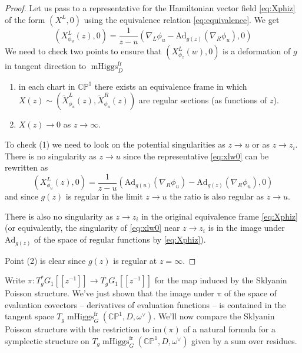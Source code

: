 \documentclass[11pt, oneside, reqno]{amsart}
\theoremstyle{definition} \newtheorem{definition}{Definition}[section]
\theoremstyle{definition} \newtheorem{remark}[definition]{Remark}
\theoremstyle{definition} \newtheorem{remarks}[definition]{Remarks}
\theoremstyle{definition} \newtheorem{question}[definition]{Question}
\theoremstyle{definition} \newtheorem*{note}{Note}
\theoremstyle{definition} \newtheorem{example}[definition]{Example}
\theoremstyle{definition} \newtheorem{examples}[definition]{Examples}
\newcommand{\bb}[1]{\mathbb{#1}}
\newcommand{\mr}[1]{\mathrm{#1}}
\DeclareMathOperator{\mhiggs}{mHiggs}
\newcommand{\fr}{\mathrm{fr}}
\newcommand{\Ad}{\mr{Ad}}
\begin{document}
\begin{proof}
  Let us pass to a representative for the Hamiltonian vector field \ref{eq:Xphiz} of the form $(X^{L}, 0)$ using the equivalence relation \ref{eq:equivalence}. We get
  \begin{equation}
\label{eq:xlw0}
(X^L_{\phi_u} (z) , 0) =  \frac{1}{z - u} (\nabla_{L} \phi_u  - \Ad_{g(z)} (\nabla_{R} \phi_{u}), 0 )
  \end{equation}
  We need to check two points to ensure that $(X^L_{\phi_z} (w) , 0)$ is a deformation
  of $g$ in tangent direction to $\mhiggs^{\fr}_{D}$
  \begin{enumerate}
  \item in each chart in $\bb{CP}^1$ there exists an equivalence frame in which $X(z) \sim (\tilde X_{\phi_{u}}^{L}(z), \tilde X_{\phi_{u}}^{R}(z))$  are regular sections (as functions of $z$).
  \item $X(z) \to 0$ as $z \to \infty$.
  \end{enumerate}

  To check (1) we need to look on the potential singularities as $z \to u$ or as $z \to z_i$.  There is no singularity as $z \to u$ since the representative \ref{eq:xlw0} can be rewritten as
  \begin{equation}
\label{eq:sklyanin-left}
(X^L_{\phi_u}(z) , 0)  =     \frac{1}{z - u} (\Ad_{g(u)}(\nabla_{R} \phi_u)  - \Ad_{g(z)} (\nabla_{R} \phi_{u}),0)
  \end{equation}
  and since $g(z)$ is regular in the limit $z \to u$ the ratio is also regular as $z \to u$.
  
  There is also no singularity as $z \to z_i$ in the original equivalence frame \ref{eq:Xphiz} (or equivalently, the singularity of \ref{eq:xlw0} near $z \to z_i$  is in the image under $\Ad_{g(z)}$ of the space of regular functions by \ref{eq:Xphiz}).
 
 Point (2) is clear since $g(z)$ is regular at $z = \infty$. 
\end{proof}

Write $\pi \colon T^*_g G_1[[z^{-1}]] \to T_g G_1[[z^{-1}]]$ for the map induced by the Sklyanin Poisson structure.  We've just shown that the image under $\pi$ of the space of evaluation covectors -- derivatives of evaluation functions -- is contained in the tangent space $T_{g}\mhiggs^\fr_G(\bb{CP}^1, D, \omega^\vee)$.  We'll now compare the Sklyanin Poisson structure with the restriction to $\mr{im}(\pi)$ of a natural formula for a symplectic structure on $T_{g}\mhiggs^\fr_G(\bb{CP}^1, D, \omega^\vee)$ given by a sum over residues.
\end{document}

